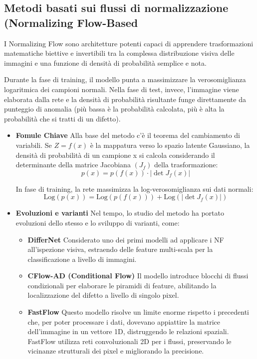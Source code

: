 \subsection{Metodi basati sui flussi di normalizzazione (Normalizing Flow-Based}

I Normalizing Flow sono architetture potenti capaci di apprendere trasformazioni matematiche biettive e invertibili tra la complessa distribuzione visiva delle immagini e una funzione di densità di probabilità semplice e nota.

Durante la fase di training, il modello punta a massimizzare la verosomiglianza logaritmica dei campioni normali. Nella fase di test, invece, l'immagine viene elaborata dalla rete e la densità di probabilità risultante funge direttamente da punteggio di anomalia (più bassa è la probabilità calcolata, più è alta la probabilità che si tratti di un difetto).\cite{Cui_et_al._2023}


\begin{itemize}
    \item\textbf{Fomule Chiave}
    Alla base del metodo c'è il teorema del cambiamento di variabili. Se $Z=f(x)$ è la mappatura verso lo spazio latente Gaussiano, la densità di probabilità di un campione x si calcola considerando il determinante della matrice Jacobiana $(J_f)$ della trasformazione:
    \[
    p(x) = p(f(x)) \cdot | \det J_f(x) |
    \]

    In fase di training, la rete massimizza la log-verosomiglianza sui dati normali: 
    \[
    \text{Log}(p(x)) = \text{Log}(p(f(x))) + \text{Log}(| \det J_f(x) |)
    \]

    \item \textbf{Evoluzioni e varianti}
    Nel tempo, lo studio del metodo ha portato evoluzioni dello stesso e lo sviluppo di varianti, come:

    \begin{itemize}
        \item \textbf{DifferNet}
        Considerato uno dei primi modelli ad applicare i NF all'ispezione visiva, estraendo delle feature multi-scala per la classificazione a livello di immagini.

        \item\textbf{CFlow-AD (Conditional Flow)}
        Il modello introduce blocchi di flussi condizionali per elaborare le piramidi di feature, abilitando la localizzazione del difetto a livello di singolo pixel.

        \item \textbf{FastFlow}
        Questo modello risolve un limite enorme rispetto i precedenti che, per poter processare i dati, dovevano appiattire la matrice dell'immagine in un vettore 1D, distruggendo le relazioni spaziali. FastFlow utilizza reti convoluzionali 2D per i flussi, preservando le vicinanze strutturali dei pixel e migliorando la precisione.\cite{Cui_et_al._2023}
    \end{itemize}
\end{itemize}

